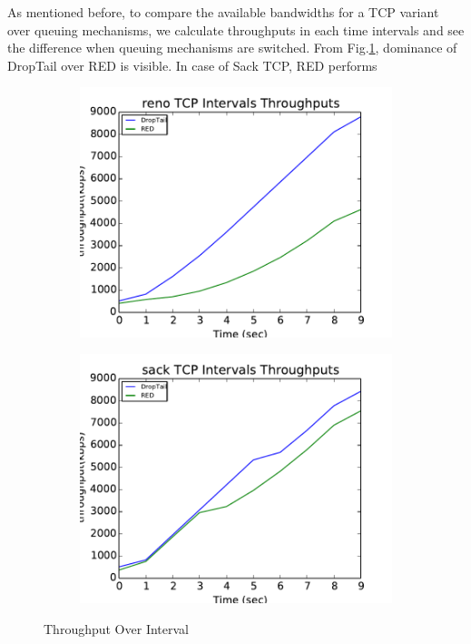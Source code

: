 \documentclass[USenglish,oneside,twocolumn]{article}
\begin{document}
As mentioned before, to compare the available bandwidths for a TCP variant over queuing mechanisms, we calculate throughputs in each time intervals and see the difference when queuing mechanisms are switched. From Fig.\ref{intervals}, dominance of DropTail over RED is visible. In case of Sack TCP, RED performs 
\begin{figure}[h]
\captionsetup{justification=centering}
    \centering
    \begin{subfigure}{0.5\linewidth}
        \centering
        \includegraphics[width=\linewidth]{fig/reno_intervals_RED_DT.pdf} %
    \end{subfigure}
    \begin{subfigure}{0.48\linewidth}
        \centering
        \includegraphics[width=\linewidth]{fig/Sack_intervals_RED_DT.pdf} %
    \end{subfigure}
\caption{Throughput Over Interval}
\label{intervals}
\end{figure}
\end{document}
